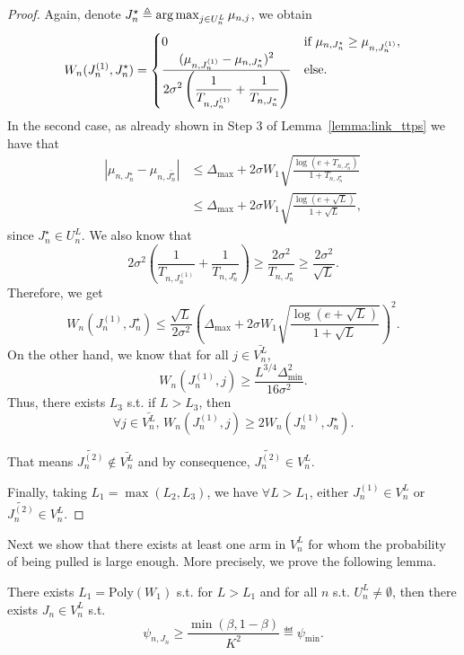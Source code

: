 \begin{proof}
    Again, denote $J_n^\star \triangleq \operatorname*{arg\,max}_{j\in U_n^L} \mu_{n,j}$, we obtain
    \begin{equation*}
        W_n(J_n^{(1)},J_n^\star) = \begin{cases}
        0 &\text{if } \mu_{n,J_n^\star}\geq\mu_{n,J_n^{(1)}}, \\
        \frac{\displaystyle (\mu_{n,J_n^{(1)}}-\mu_{n,J_n^\star})^2}{\displaystyle 2\sigma^2\left(\frac{1}{T_{n,J_n^{(1)}}}+\frac{1}{T_{n,J_n^\star}}\right)} &\text{else}.
        \end{cases}
    \end{equation*}
    In the second case, as already shown in Step 3 of Lemma~\ref{lemma:link_ttps} we have that
    \begin{align*}
        |\mu_{n,J_n^\star} - \mu_{n,\bar{J_n^\star}}| 
        &\leq \Delta_{\max} + 2\sigma W_1 \sqrt{\frac{\log(e+T_{n,J_n^\star})}{1+T_{n,J_n^\star}}}\\
        &\leq \Delta_{\max} + 2\sigma W_1 \sqrt{\frac{\log(e+\sqrt{L})}{1+\sqrt{L}}},
    \end{align*}
    since $J_n^\star \in U_n^L$. We also know that
    \[
        2\sigma^2\left(\frac{1}{T_{n,J_n^{(1)}}}+\frac{1}{T_{n,J_n^\star}}\right) \geq \frac{2\sigma^2}{T_{n,J_n^\star}} \geq \frac{2\sigma^2}{\sqrt{L}}.
    \]
    Therefore, we get
    \[
        W_n(J_n^{(1)},J_n^\star) \leq \frac{\sqrt{L}}{2\sigma^2}\left(\Delta_{\max} + 2\sigma W_1 \sqrt{\frac{\log(e+\sqrt{L})}{1+\sqrt{L}}}\right)^2.
    \]
    On the other hand, we know that for all $j\in\bar{V_n^L}$,
    \[
        W_n(J_n^{(1)},j) \geq \frac{L^{3/4}\Delta_{\text{min}}^2}{16\sigma^2}.
    \]
    Thus, there exists $L_3$ s.t. if $L>L_3$, then
    \[
        \forall j\in \bar{V_n^L},\, W_n(J_n^{(1)},j) \geq 2W_n(J_n^{(1)},J_n^\star).
    \]
    
    That means $\tilde{J_n^{(2)}}\notin \bar{V_n^L}$ and by consequence, $\tilde{J_n^{(2)}}\in V_n^L$.
    
    Finally, taking $L_1 = \max(L_2, L_3)$, we have $\forall L > L_1$, either $J_n^{(1)} \in V_n^L$ or $\tilde{J_n^{(2)}} \in V_n^L$.
\end{proof}

Next we show that there exists at least one arm in $V_n^L$ for whom the probability of being pulled is large enough. More precisely, we prove the following lemma.

\begin{lemma}\label{lemma:psi_min_t3c}
    There exists $L_1 = \text{Poly}(W_1)$ s.t. for $L > L_1$ and for all $n$ s.t. $U_n^L \neq \emptyset$, then there exists $J_n \in V_n^L$ s.t.
    \[
        \psi_{n,J_n} \geq \frac{\min(\beta,1-\beta)}{K^2} \eqdef \psi_{\min}.
    \]
\end{lemma}

